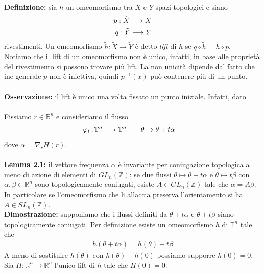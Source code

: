 \documentclass{article}
\begin{document}
\textbf{Definizione:} sia $h$ un omeomorfismo tra $X$ e $Y$ spazi topologici e siano
\begin{align}
    p : \tilde{X} \longrightarrow X \notag \\
    q : \tilde{Y} \longrightarrow Y \notag
\end{align}
rivestimenti. Un omeomorfismo $\tilde{h} : \tilde{X} \longrightarrow \tilde{Y}$ è detto \textit{lift} di $h$ se $q \circ \tilde{h} = h \circ p$. \\
Notiamo che il lift di un omeomorfismo non è unico, infatti, in base alle proprietà del rivestimento si possono trovare più lift. La non unicità dipende dal fatto che ine generale $p$ non è iniettiva, quindi $p^{-1}(x)$ può contenere più di un punto. \\ \\
\textbf{Osservazione:} il lift è unico una volta fissato un punto iniziale. Infatti, dato \\ \\
Fissiamo $r \in \mathbb{R}^n$ e consideriamo il flusso 
\begin{align}
    \varphi_t : &\mathbb{T}^n \longrightarrow \mathbb{T}^n \qquad \theta \mapsto \theta + t\alpha \notag
\end{align}
dove $\alpha = \nabla_rH(r)$. \\ \\
\textbf{Lemma 2.1:} il vettore frequenza $\alpha$ è invariante per coniugazione topologica a meno di azione di elementi di $GL_n(\mathbb{Z})$: se due flussi $\theta \mapsto \theta + t\alpha$ e $\theta \mapsto t\beta$ con $\alpha, \beta \in \mathbb{R}^n$ sono topologicamente coniugati, esiste $A \in GL_n(\mathbb{Z})$ tale che $\alpha = A\beta$. In particolare se l'omeomorfismo che li allaccia preserva l'orientamento si ha $A \in SL_n(\mathbb{Z})$. \\

\textbf{Dimostrazione:} supponiamo che i flussi definiti da $\theta + t\alpha$ e $\theta + t\beta$ siano topologicamente coniugati. Per definizione esiste un omeomorfismo $h$ di $\mathbb{T}^n$ tale che 
\begin{align}
    h(\theta + t\alpha) = h(\theta) + t\beta \tag{2.5}
\end{align}
A meno di sostituire $h(\theta)$ con $h(\theta) - h(0)$ possiamo supporre $h(0) = 0$. Sia $H : \mathbb{R}^n \longrightarrow \mathbb{R}^n$ l'unico lift di $h$ tale che $H(0) = 0$.
\end{document}

